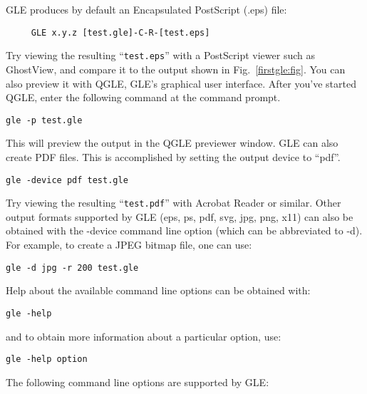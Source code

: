 GLE produces by default an Encapsulated PostScript (.eps) file:

\preglecode{}
\begin{Verbatim}
     GLE x.y.z [test.gle]-C-R-[test.eps]
\end{Verbatim}
\postglecode{}

Try viewing the resulting ``\texttt{test.eps}'' with a PostScript viewer such as GhostView, and compare it to the output shown in Fig.~\ref{firstgle:fig}. You can also preview it with QGLE, GLE's graphical user interface. After you've started QGLE, enter the following command at the command prompt.

\preglecode{}
\begin{Verbatim}
gle -p test.gle
\end{Verbatim}
\postglecode{}

This will preview the output in the QGLE previewer window. GLE can also create PDF files. This is accomplished by setting the output device to ``pdf''.

\preglecode{}
\begin{Verbatim}
gle -device pdf test.gle
\end{Verbatim}
\postglecode{}

Try viewing the resulting ``\texttt{test.pdf}'' with Acrobat Reader or similar. Other output formats supported by GLE (eps, ps, pdf, svg, jpg, png, x11) can also be obtained with the -device command line option (which can be abbreviated to -d). For example, to create a JPEG bitmap file, one can use:

\preglecode{}
\begin{Verbatim}
gle -d jpg -r 200 test.gle
\end{Verbatim}
\postglecode{}

Help about the available command line options can be obtained with:

\preglecode{}
\begin{Verbatim}
gle -help
\end{Verbatim}
\postglecode{}

\noindent{}and to obtain more information about a particular option, use:

\preglecode{}
\begin{Verbatim}
gle -help option
\end{Verbatim}
\postglecode{}

The following command line options are supported by GLE:


